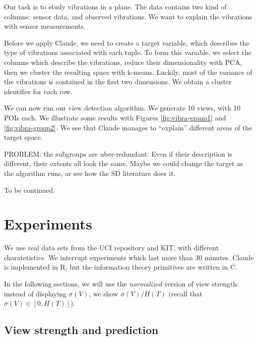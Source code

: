 Our task is to study vibrations in a plane. The data contains two kind of
columns: sensor data, and observed vibrations. We want to explain the
vibrations with sensor measurements.

Before we apply Claude, we need to create a target variable, which describes
the type of vibrations associated with each tuple. To form this variable, we
select the columns which describe the vibrations, reduce their dimensionality
with PCA, then we cluster the resulting space with k-means. Luckily, most of
the variance of the vibrations is contained in the first two dimensions. We
obtain a cluster identifier for each row.

We can now run our view detection algorithm. We generate 10 views, with 10 POIs
each. We illustrate some results with Figures \ref{fig:vibra-group1} and
\ref{fig:vibra-group2}. We see that Claude manages to ``explain'' different
areas of the target space.

PROBLEM: the subgroups are uber-redundant. Even if their description is
different, their extents all look the same. Maybe we could change the target
as the algorithm runs, or see how the SD literature does it.

To be continued.

\section{Experiments}

We use real data sets from the UCI repository and KIT, with different
charatetistics. We interrupt experiments which last more than 30 minutes.
Claude is implemented in R, but the information theory primitives are written
in C.

In the following sections, we will use the \emph{normalized} version of view
strength: instead of displaying $\sigma(V)$, we show $\sigma(V) / H(T)$ (recall
that $\sigma(V) \in [0, H(T) ]$).

\subsection{View strength and prediction}

